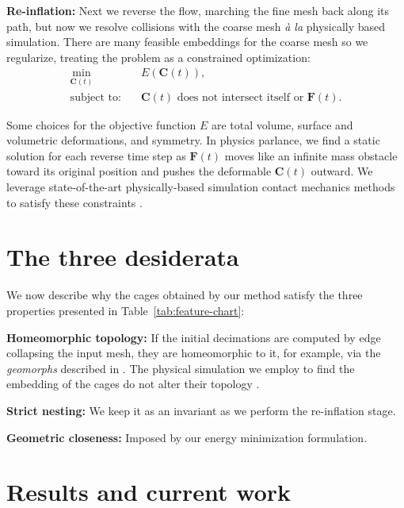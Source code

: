 \documentclass{cgyrf15}
\begin{document}
\noindent \textbf{Re-inflation:} Next we reverse the flow,
marching the fine mesh back along its path, but now we resolve collisions with
the coarse mesh \emph{\`{a} la} physically based simulation. There are many
feasible embeddings for the coarse mesh so we regularize, treating the problem
as a constrained optimization:
\begin{align}
\min_{\mathbf{C}(t)}  &\quad E(\mathbf{C}(t)),\\
\text{subject to:} &\quad \text{$\mathbf{C}(t)$ does not intersect itself or $\mathbf{F}(t)$}.
\end{align}

Some choices for the objective function $E$ are total volume, surface and volumetric deformations,
and symmetry. In physics parlance, we find a static solution for each reverse time step as
$\mathbf{F}(t)$ moves like an infinite mass obstacle toward its original
position and pushes the deformable $\mathbf{C}(t)$ outward. We leverage state-of-the-art
physically-based simulation contact mechanics methods to satisfy these
constraints \cite{Brochu:2009}. 

\section{The three desiderata}

We now describe why the cages obtained by our method satisfy the three properties
presented in Table~\ref{tab:feature-chart}:

\noindent \textbf{Homeomorphic topology:} If the initial decimations are computed by edge collapsing the input mesh,
they are homeomorphic to it, for example, via the \emph{geomorphs} described
in \cite{Hoppe:1996:PM}. The physical simulation we employ to find the embedding of the cages
do not alter their topology \cite{Brochu:2009}.

\noindent \textbf{Strict nesting:} We keep it as an invariant as we perform the re-inflation stage.  

\noindent \textbf{Geometric closeness:} Imposed by our energy minimization formulation.

\section{Results and current work}

\end{document}
